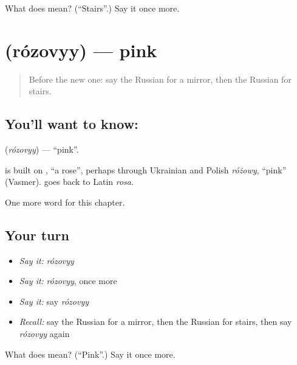 \begin{tcolorbox}[breakable,colback=teal!4,colframe=teal!35!black,title={Before you move on}]
What does  mean? (\textquotedblleft{}Stairs\textquotedblright{}.) Say it once more.
\end{tcolorbox}
\section[\texorpdfstring{\ru{розовый} (rózovyy)}{розовый (rózovyy)}]{ (rózovyy) — pink}

\label{lesson:RU-C123-pink}



\begin{quote}
Before the new one: say the Russian for a mirror, then the Russian for stairs.
\end{quote}

\subsection*{You'll want to know: }
\textbf{} (\emph{rózovyy}) — \textquotedblleft{}pink\textquotedblright{}.

\begin{cousinweb}
\textbf{} is built on \emph{}, \textquotedblleft{}a rose\textquotedblright{}, perhaps through Ukrainian \emph{} and Polish \emph{różowy}, \textquotedblleft{}pink\textquotedblright{} (Vasmer). \emph{} goes back to Latin \emph{rosa}.
\end{cousinweb}

\begin{grammarlens}[title={What you've built}]
One more word for this chapter.
\end{grammarlens}

\subsection*{Your turn}
\begin{itemize}
\raggedright
  \item \emph{Say it:} \emph{rózovyy}
  \item \emph{Say it:} \emph{rózovyy}, once more
  \item \emph{Say it:} say \emph{rózovyy}
  \item \emph{Recall:} say the Russian for a mirror, then the Russian for stairs, then say \emph{rózovyy} again
\end{itemize}

\begin{tcolorbox}[breakable,colback=teal!4,colframe=teal!35!black,title={Before you move on}]
What does  mean? (\textquotedblleft{}Pink\textquotedblright{}.) Say it once more.
\end{tcolorbox}
